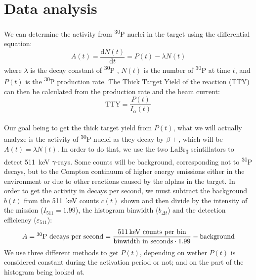 \documentclass[a4paper,12pt]{report}
\newcommand{\dif}{\text{d}}
\newcommand{\ddt}[1]{\frac{\dif #1}{\dif t}}
\newcommand{\an}{($\alpha$,n) }
\newcommand{\Piso}{\textsuperscript{30}P }
\begin{document}
\section{Data analysis}
We can determine the activity from \Piso nuclei in the target using the differential equation:
\begin{equation}
	A(t) = \ddt{N(t)} = P(t) -\lambda N(t)
	\label{activation_diffeq}
\end{equation}
where $\lambda$ is the decay constant of \Piso, $N(t)$ is the number of \Piso at time $t$, and $P(t)$ is the \Piso production rate.
The Thick Target Yield of the reaction (TTY) can then be calculated from the production rate and the beam current:
\begin{equation}
	\text{TTY} = \frac{P(t)}{I_\alpha(t)}
\end{equation}
\\

Our goal being to get the thick target yield from $P(t)$, what we will actually analyze is the activity of \Piso nuclei as they decay by $\beta +$, which will be $A(t) = \lambda N(t)$.
In order to do that, we use the two LaBr\textsubscript{3} scintillators to detect \qty{511}{\keV} $\gamma$-rays.
Some counts will be background, corresponding not to \Piso decays, but to the Compton continuum of higher energy emissions either in the environment or due to other reactions caused by the alphas in the target.
In order to get the activity in decays per second, we must subtract the background $b(t)$ from the \qty{511}{\keV} counts $c(t)$ shown and then divide by the intensity of the mission ($I_{511}=\num{1.99}$), the histogram binwidth ($b_{\Delta t}$) and the detection efficiency ($\varepsilon_{511}$):
\begin{equation}
	A = \text{\Piso decays per second} = \frac{\text{\qty{511}{\keV} counts per bin}}{\text{binwidth in seconds}\cdot\num{1.99}} - \text{background}
\end{equation}
We use three different methods to get $P(t)$, depending on wether $P(t)$ is considered constant during the activation period or not; and on the part of the histogram being looked at.
\end{document}
